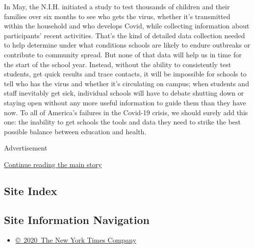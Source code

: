 In May, the N.I.H. initiated a study to test thousands of children and
their families over six months to see who gets the virus, whether it's
transmitted within the household and who develops Covid, while
collecting information about participants' recent activities. That's the
kind of detailed data collection needed to help determine under what
conditions schools are likely to endure outbreaks or contribute to
community spread. But none of that data will help us in time for the
start of the school year. Instead, without the ability to consistently
test students, get quick results and trace contacts, it will be
impossible for schools to tell who has the virus and whether it's
circulating on campus; when students and staff inevitably get sick,
individual schools will have to debate shutting down or staying open
without any more useful information to guide them than they have now. To
all of America's failures in the Covid-19 crisis, we should surely add
this one: the inability to get schools the tools and data they need to
strike the best possible balance between education and health.

Advertisement

\protect\hyperlink{after-bottom}{Continue reading the main story}

\hypertarget{site-index}{%
\subsection{Site Index}\label{site-index}}

\hypertarget{site-information-navigation}{%
\subsection{Site Information
Navigation}\label{site-information-navigation}}

\begin{itemize}
\tightlist
\item
  \href{https://help.nytimes.com/hc/en-us/articles/115014792127-Copyright-notice}{©~2020~The
  New York Times Company}
\end{itemize}

